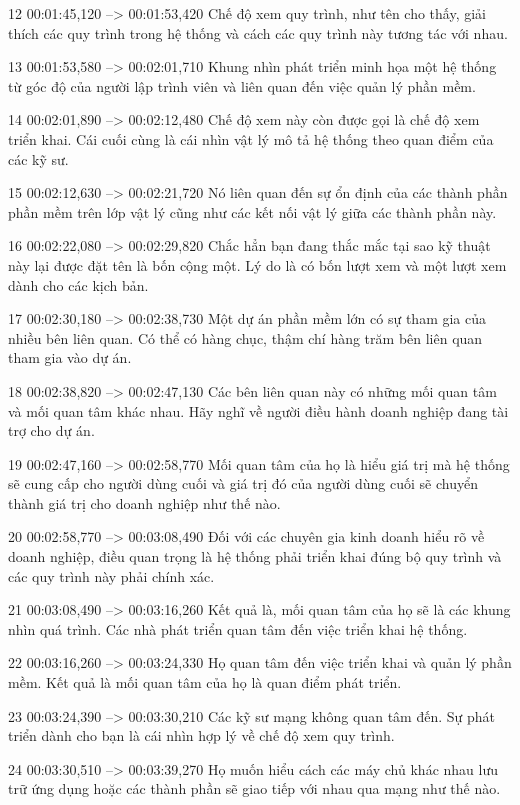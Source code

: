 12
00:01:45,120 --> 00:01:53,420
Chế độ xem quy trình, như tên cho thấy, giải thích các quy trình trong hệ thống và cách các quy trình này tương tác với nhau.

13
00:01:53,580 --> 00:02:01,710
Khung nhìn phát triển minh họa một hệ thống từ góc độ của người lập trình viên và liên quan đến việc quản lý phần mềm.

14
00:02:01,890 --> 00:02:12,480
Chế độ xem này còn được gọi là chế độ xem triển khai.  Cái cuối cùng là cái nhìn vật lý mô tả hệ thống theo quan điểm của các kỹ sư.

15
00:02:12,630 --> 00:02:21,720
Nó liên quan đến sự ổn định của các thành phần phần mềm trên lớp vật lý cũng như các kết nối vật lý giữa các thành phần này.

16
00:02:22,080 --> 00:02:29,820
Chắc hẳn bạn đang thắc mắc tại sao kỹ thuật này lại được đặt tên là bốn cộng một.  Lý do là có bốn lượt xem và một lượt xem dành cho các kịch bản.

17
00:02:30,180 --> 00:02:38,730
Một dự án phần mềm lớn có sự tham gia của nhiều bên liên quan.  Có thể có hàng chục, thậm chí hàng trăm bên liên quan tham gia vào dự án.

18
00:02:38,820 --> 00:02:47,130
Các bên liên quan này có những mối quan tâm và mối quan tâm khác nhau.  Hãy nghĩ về người điều hành doanh nghiệp đang tài trợ cho dự án.

19
00:02:47,160 --> 00:02:58,770
Mối quan tâm của họ là hiểu giá trị mà hệ thống sẽ cung cấp cho người dùng cuối và giá trị đó của người dùng cuối sẽ chuyển thành giá trị cho doanh nghiệp như thế nào.

20
00:02:58,770 --> 00:03:08,490
Đối với các chuyên gia kinh doanh hiểu rõ về doanh nghiệp, điều quan trọng là hệ thống phải triển khai đúng bộ quy trình và các quy trình này phải chính xác.

21
00:03:08,490 --> 00:03:16,260
Kết quả là, mối quan tâm của họ sẽ là các khung nhìn quá trình.  Các nhà phát triển quan tâm đến việc triển khai hệ thống.

22
00:03:16,260 --> 00:03:24,330
Họ quan tâm đến việc triển khai và quản lý phần mềm.  Kết quả là mối quan tâm của họ là quan điểm phát triển.

23
00:03:24,390 --> 00:03:30,210
Các kỹ sư mạng không quan tâm đến.  Sự phát triển dành cho bạn là cái nhìn hợp lý về chế độ xem quy trình.

24
00:03:30,510 --> 00:03:39,270
Họ muốn hiểu cách các máy chủ khác nhau lưu trữ ứng dụng hoặc các thành phần sẽ giao tiếp với nhau qua mạng như thế nào.

